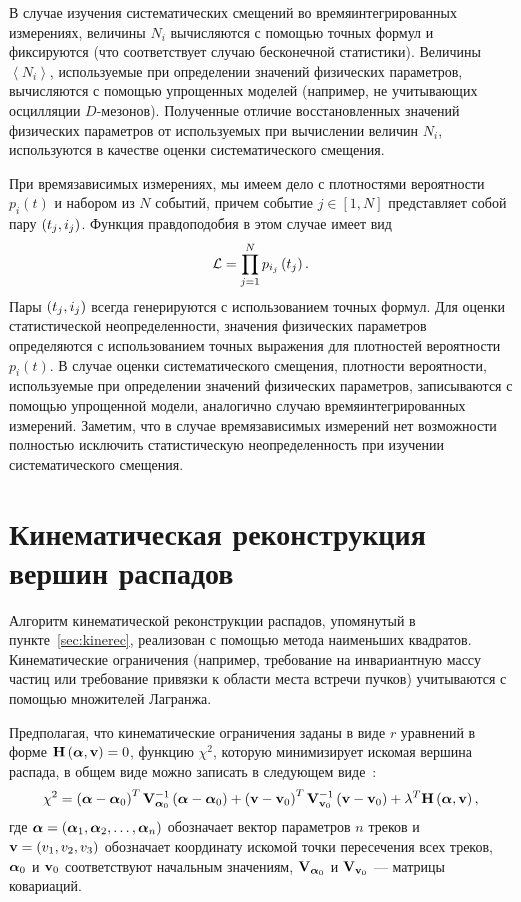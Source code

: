 В случае изучения систематических смещений во времяинтегрированных измерениях, величины $N_i$ вычисляются с помощью точных формул и фиксируются (что соответствует случаю бесконечной статистики).  Величины $\left< N_i\right>$, используемые при определении значений физических параметров, вычисляются с помощью упрощенных моделей (например, не учитывающих осцилляции $D$-мезонов).  Полученные отличие восстановленных значений физических параметров от используемых при вычислении величин $N_i$, используются в качестве оценки систематического смещения.

При времязависимых измерениях, мы имеем дело с плотностями вероятности $p_i(t)$ и набором из $N$ событий, причем событие $j\in\left[ 1, N\right]$ представляет собой пару $\left( t_j, i_j \right)$.  Функция правдоподобия в этом случае имеет вид
\begin{equation}
 \mathcal{L} = \prod\limits_{j=1}^{N}p_{i_j}\left( t_j\right).
\end{equation}
Пары $\left( t_j, i_j \right)$ всегда генерируются с использованием точных формул.  Для оценки статистической неопределенности, значения физических параметров определяются с использованием точных выражения для плотностей вероятности $p_i(t)$.  В случае оценки систематического смещения, плотности вероятности, используемые при определении значений физических параметров, записываются с помощью упрощенной модели, аналогично случаю времяинтегрированных измерений.  Заметим, что в случае времязависимых измерений нет возможности полностью исключить статистическую неопределенность при изучении систематического смещения.

\chapter{Кинематическая реконструкция вершин распадов} \label{app:kine-rec}
Алгоритм кинематической реконструкции распадов, упомянутый в пункте~\ref{sec:kinerec}, реализован с помощью метода наименьших квадратов.  Кинематические ограничения (например, требование на инвариантную массу частиц или требование привязки к области места встречи пучков) учитываются с помощью множителей Лагранжа.

Предполагая, что кинематические ограничения заданы в виде $r$ уравнений в форме $\mathbf{H}\left(\boldsymbol{\alpha},\mathbf{v}\right)=0$, функцию $\chi^2$, которую минимизирует искомая вершина распада, в общем виде можно записать в следующем виде~\cite{Avery}:
\begin{equation}
 \chi^2 = \left( \boldsymbol{\alpha} - \boldsymbol{\alpha}_0 \right)^T\mathbf{V}_{\boldsymbol{\alpha}_0}^{-1}\left( \boldsymbol{\alpha} - \boldsymbol{\alpha}_0 \right) 
        + \left(  \mathbf{v} -  \mathbf{v}_0 \right)^T\mathbf{V}_{ \mathbf{v}_0}^{-1}\left(  \mathbf{v} -  \mathbf{v}_0 \right) 
        + \lambda^T\mathbf{H} \left( \boldsymbol{\alpha}, \mathbf{v} \right),
\end{equation}
где $\boldsymbol{\alpha} = \left( \boldsymbol{\alpha}_1, \boldsymbol{\alpha}_2, \dots, \boldsymbol{\alpha}_n \right)$ обозначает вектор параметров $n$ треков и $\mathbf{v} = \left( v_1,v_2,v_3 \right)$ обозначает координату искомой точки пересечения всех треков,  $\boldsymbol{\alpha}_0$ и $\mathbf{v}_0$ соответствуют начальным значениям, $\mathbf{V}_{\boldsymbol{\alpha}_0}$ и $\mathbf{V}_{\mathbf{v}_0}$ --- матрицы ковариаций.

